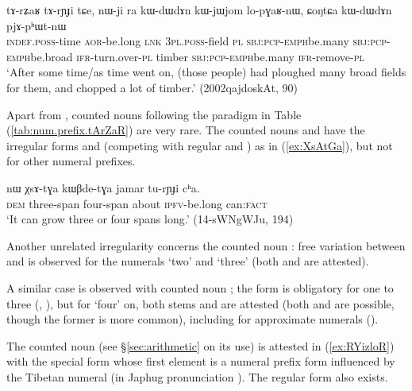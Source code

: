 \begin{exe}
\ex \label{ex:tArZaR.tArYJi}
\gll tɤ-rʑaʁ tɤ-rɲɟi tɕe, nɯ-ji ra kɯ-dɯ\redp{}dɤn kɯ-jɯ\redp{}jom lo-pɣaʁ-nɯ, ɕoŋtɕa kɯ-dɯ\redp{}dɤn pjɤ-pʰɯt-nɯ \\
\textsc{indef}.\textsc{poss}-time \textsc{aor}-be.long \textsc{lnk} \textsc{3pl}.\textsc{poss}-field \textsc{pl} \textsc{sbj}:\textsc{pcp}-\textsc{emph}\redp{}be.many \textsc{sbj}:\textsc{pcp}-\textsc{emph}\redp{}be.broad \textsc{ifr}-turn.over-\textsc{pl} timber \textsc{sbj}:\textsc{pcp}-\textsc{emph}\redp{}be.many \textsc{ifr}-remove-\textsc{pl} \\
\glt `After some time/as time went on, (those people) had ploughed many broad fields for them, and chopped a lot of timber.' (2002qajdoskAt, 90)
\end{exe}

Apart from  , counted nouns following the paradigm in Table (\ref{tab:num.prefix.tArZaR}) are very rare. The counted nouns  and  have the irregular forms  and  (competing with regular  and ) as in (\ref{ex:XsAtGa}), but not for other numeral prefixes. 

\begin{exe}
\ex \label{ex:XsAtGa}
\gll nɯ χsɤ-tɣa kɯβde-tɣa jamar tu-rɲɟi cʰa. \\
\textsc{dem} three-span four-span about \textsc{ipfv}-be.long can:\textsc{fact} \\
\glt `It can grow three or four spans long.' (14-sWNgWJu, 194)
\end{exe}

Another unrelated irregularity concerns the counted noun : free variation between  and  is observed for the numerals `two' and `three' (both  and  are attested).

A similar case is observed with counted noun ; the form  is obligatory for one to three (, ), but for `four' on, both stems  and  are attested (both  and  are possible, though the former is more common), including for approximate numerals ().  

The counted noun  (see §\ref{sec:arithmetic} on its use) is attested in (\ref{ex:RYizloR}) with the special form  whose first element is a numeral prefix form  influenced by the Tibetan numeral  (in Japhug pronunciation ). The regular form  also exists.
 
